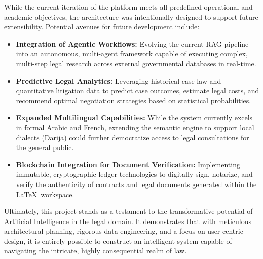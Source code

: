 While the current iteration of the platform meets all predefined operational and academic objectives, the architecture was intentionally designed to support future extensibility. Potential avenues for future development include:

\begin{itemize}
    \item \textbf{Integration of Agentic Workflows:} Evolving the current RAG pipeline into an autonomous, multi-agent framework capable of executing complex, multi-step legal research across external governmental databases in real-time.
    \item \textbf{Predictive Legal Analytics:} Leveraging historical case law and quantitative litigation data to predict case outcomes, estimate legal costs, and recommend optimal negotiation strategies based on statistical probabilities.
    \item \textbf{Expanded Multilingual Capabilities:} While the system currently excels in formal Arabic and French, extending the semantic engine to support local dialects (Darija) could further democratize access to legal consultations for the general public.
    \item \textbf{Blockchain Integration for Document Verification:} Implementing immutable, cryptographic ledger technologies to digitally sign, notarize, and verify the authenticity of contracts and legal documents generated within the \LaTeX\ workspace.
\end{itemize}

Ultimately, this project stands as a testament to the transformative potential of Artificial Intelligence in the legal domain. It demonstrates that with meticulous architectural planning, rigorous data engineering, and a focus on user-centric design, it is entirely possible to construct an intelligent system capable of navigating the intricate, highly consequential realm of law.